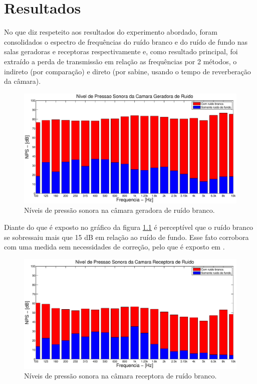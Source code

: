 \chapter{Resultados}\label{resultados}

No que diz respeteito aos resultados do experimento abordado, foram consolidados o espectro de frequências do ruído branco e do ruído de fundo nas salas geradoras e receptoras respectivamente e, como resultado principal, foi extraído a perda de transmissão em relação as frequências por 2 métodos, o indireto (por comparação) e direto (por sabine, usando o tempo de reverberação da câmara).

\begin{figure}[h]
\hspace{-4.5cm}
\includegraphics[scale=0.6]{codigo/pressao_sonora_geradora.eps}
\caption{Níveis de pressão sonora na câmara geradora de ruído branco.}
\label{resultado_1}
\end{figure}

Diante do que é exposto no gráfico da figura \ref{resultado_1} é perceptível que o ruído branco se sobressaiu mais que 15 dB em relação ao ruído de fundo. Esse fato corrobora com uma medida sem necessidades de correção, pelo que é exposto em \cite{silva2009simulaccao}.

\newpage
\begin{figure}[h]
\hspace{-4.5cm}
\includegraphics[scale=0.6]{codigo/pressao_sonora_receptora.eps}
\caption{Níveis de pressão sonora na câmara receptora de ruído branco.}
\label{resultado_2}
\end{figure}

